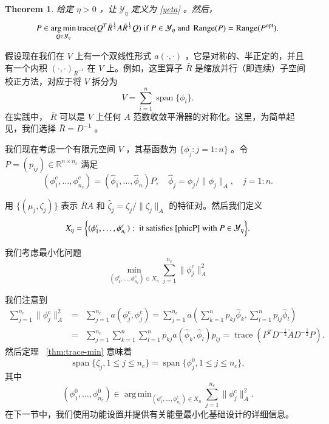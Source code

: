 \documentclass[12pt]{acta_2011xz}
\newcommand{\trace}{\ensuremath{\operatorname{trace}}}
\newcommand{\Span}{\ensuremath{\operatorname{span}}}
\newtheorem{theorem}{Theorem}[section]
\DeclareMathOperator*{\argmin}{arg\,min}
\DeclareMathOperator*{\range}{Range}
\begin{document}
   \begin{theorem}   \label{thm:trace-min-2}    给定    $\eta>0$    ，让    $\mathcal Y_{\eta}$    定义为    \eqref{yeta}    。然后，
   $$ 
    P\in \argmin_{Q\in \mathcal{Y}_\eta}\operatorname{trace}(Q^T\bar R^{\frac{1}{2}}A\bar R^{\frac{1}{2}}Q) \text{ if }
    P\in \mathcal Y_{\eta} \text{ and } \range(P)=\range(P^{\rm opt}).
$$     \end{theorem}     


 
   

假设现在我们在    $V$    上有一个双线性形式    $a(\cdot, \cdot)$    ，它是对称的、半正定的，并且有一个内积
   $(\cdot, \cdot)_{\bar R^{-1}}$    在    $V$    上。例如，这里算子    $\bar{R}$    是缩放并行（即连续）子空间校正方法，对应于将    $V$    拆分为
   \[
V = \sum_{i=1}^n\Span \{ \phi_i \} . 
\]    在实践中，   $\bar R$    可以是    $V$    上任何    $A$    范数收敛平滑器的对称化。这里，为简单起见，我们选择    $\bar R= D^{-1}$    。  

我们现在考虑一个有限元空间    $V$   ，其基函数为    $ \{ \phi_j: j=1:n \} $   。令    $P=(p_{ij})\in \mathbb{R}^{n\times n_c}$    满足 
   \begin{equation}\label{phicP}
    (\phi_1^c, \dots, \phi_{n_c}^c) = (\hat \phi_1, \dots, \hat \phi_n)P, \quad \hat \phi_j=\phi_j/\|\phi_j\|_A, \quad j=1:n.
\end{equation}     

用    $ \{ (\mu_j, \zeta_j) \} $    表示    $\bar RA$    和    $\hat \zeta_j= \zeta_j/\|\zeta_j\|_A$    的特征对。然后我们定义 
   \begin{equation}
    X_{\eta} =\bigg \{  (\phi_1^c, \dots, \phi_{n_c}^c): \text{ it satisfies \eqref{phicP} with } P\in \mathcal Y_{\eta}\bigg \} .
\end{equation}     

我们考虑最小化问题
   \begin{equation}\label{min1}
    \min_{(\phi_1^c,\ldots,\phi_{n_c}^c)\in X_{\eta}} \sum_{j=1}^{n_c}\|\phi_j^c\|_A^2
\end{equation}     

我们注意到
   \begin{eqnarray*}
    \sum_{j=1}^{n_c}\|\phi_j^c\|_A^2 &=& \sum_{j=1}^{n_c}a(\phi_j^c,\phi_j^c)=\sum_{j=1}^{n_c}a(\sum_{k=1}^np_{kj}\hat \phi_k,\sum_{l=1}^np_{lj}\hat \phi_l)  \\ 
    & = & \sum_{j=1}^{n_c}\sum_{k=1}^n\sum_{l=1}^np_{kj}a(\hat \phi_k, \hat \phi_l)p_{lj}= \trace(P^TD^{-\frac{1}{2}}\tilde AD^{-\frac{1}{2}} P).
\end{eqnarray*}    然后定理~    \ref{thm:trace-min}    意味着
   \begin{equation}
    \Span \{ \zeta_j, 1\le j\le n_c \} =\Span \{ \phi_j^0, 1\le j\le n_c \} ,  
\end{equation}    其中
   \begin{equation}
    (\phi_1^0, \dots, \phi_{n_c}^0) \in \argmin_{(\phi_1^c, \dots, \phi_{n_c}^c)\in X_{\eta}}\sum_{j=1}^{n_c}\|\phi_j^c\|_A^2.
\end{equation}    在下一节中，我们使用功能设置并提供有关能量最小化基础设计的详细信息。  
\end{document}
